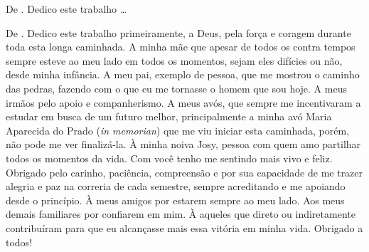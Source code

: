 \begin{dedicatoria}
\vspace*{\fill}
\vspace*{\fill}
\vspace*{\fill}
\vspace*{\fill}
\vspace*{\fill}
\vspace*{\fill}
De \imprimirAutorUm.
\newline
Dedico este trabalho \ldots 

\vspace*{\fill}
De \imprimirAutorDois.
\newline
Dedico este trabalho primeiramente, a Deus, pela força e coragem durante toda esta longa caminhada. A minha mãe que apesar de todos os contra tempos sempre esteve ao meu lado em todos os momentos, sejam eles difícies ou não, desde minha infância. A meu pai, exemplo de pessoa, que me mostrou o caminho das pedras, fazendo com o que eu me tornasse o homem que sou hoje. A meus irmãos pelo apoio e companherismo. A meus avós, que sempre me incentivaram a estudar em busca de um futuro melhor, principalmente a minha avó Maria Aparecida do Prado (\textit{in memorian}) que me viu iniciar esta caminhada, porém, não pode me ver finalizá-la. À minha noiva Josy, pessoa com quem amo partilhar todos os momentos da vida. Com você tenho me sentindo mais vivo e feliz. Obrigado pelo carinho, paciência, compreensão e por sua capacidade de me trazer alegria e paz na correria de cada semestre, sempre acreditando e me apoiando desde o princípio. À meus amigos por estarem sempre ao meu lado. Aos meus demais familiares por confiarem em mim. À aqueles que direto ou indiretamente contribuíram para que eu alcançasse mais essa vitória em minha vida. Obrigado a todos!
\end{dedicatoria}
